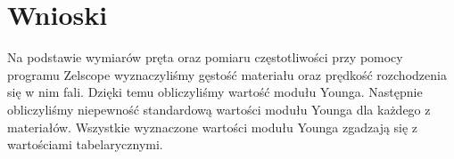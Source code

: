 \documentclass{article}
\begin{document}
\begin{table}[!htbp]
\end{table}

\section{Wnioski}

Na podstawie wymiarów pręta oraz pomiaru częstotliwości przy pomocy programu Zelscope wyznaczyliśmy gęstość materiału oraz prędkość rozchodzenia się w nim fali. Dzięki temu obliczyliśmy wartość modułu Younga.
	Następnie obliczyliśmy niepewność standardową wartości modułu Younga dla każdego z materiałów. Wszystkie wyznaczone wartości modułu Younga zgadzają się z wartościami tabelarycznymi.
\end{document}
